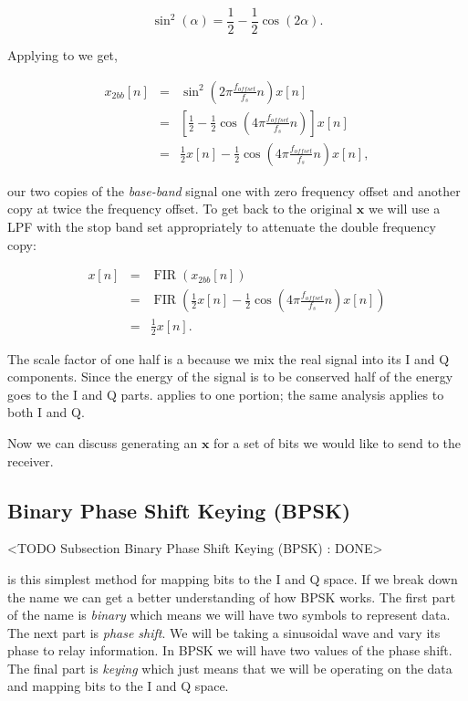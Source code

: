 \begin{equation}
\label{eq:trigid}
\sin^2(\alpha) = \frac{1}{2} - \frac{1}{2}\cos(2\alpha).
\end{equation}

Applying  to  we get,

\begin{eqnarray}
\label{eq:2bbtrig}
x_{2bb}[n] &=& \sin^2\left(2\pi\frac{f_{offset}}{f_s}n\right)x[n]\\
&=& \left[\frac{1}{2} - \frac{1}{2}\cos(4\pi\frac{f_{offset}}{f_s}n)\right]x[n]\\
&=& \frac{1}{2}x[n] - \frac{1}{2}\cos\left(4\pi\frac{f_{offset}}{f_s}n\right)x[n],
\end{eqnarray}

our two copies of the \emph{base-band} signal one with zero frequency offset and another copy at twice the frequency offset. To get back to the original $\mathbf{x}$ we will use a \ac{LPF} with the stop band set appropriately to attenuate the double frequency copy:

\begin{eqnarray}
\label{eq:fir}
x[n] &=& \operatorname{FIR}(x_{2bb}[n])\\
&=& \operatorname{FIR}\left(\frac{1}{2}x[n] - \frac{1}{2}\cos\left(4\pi\frac{f_{offset}}{f_s}n\right)x[n]\right)\\
&=& \frac{1}{2}x[n].
\end{eqnarray}

The scale factor of one half is a because we mix the real signal into its \ac{I} and \ac{Q} components. Since the energy of the signal is to be conserved half of the energy goes to the \ac{I} and \ac{Q} parts.  applies to one portion; the same analysis applies to both \ac{I} and \ac{Q}.

Now we can discuss generating an $\mathbf{x}$ for a set of bits we would like to send to the receiver. 
	
\subsection{Binary Phase Shift Keying (BPSK)}
	<TODO Subsection Binary Phase Shift Keying (BPSK) : DONE>

 is this simplest method for mapping bits to the \ac{I} and \ac{Q} space. If we break down the name we can get a better understanding of how \ac{BPSK} works. The first part of the name is \emph{binary} which means we will have two symbols to represent data. The next part is \emph{phase shift}. We will be taking a sinusoidal wave and vary its phase to relay information. In \ac{BPSK} we will have two values of the phase shift. The final part is \emph{keying} which just means that we will be operating on the data and mapping bits to the \ac{I} and \ac{Q} space.

